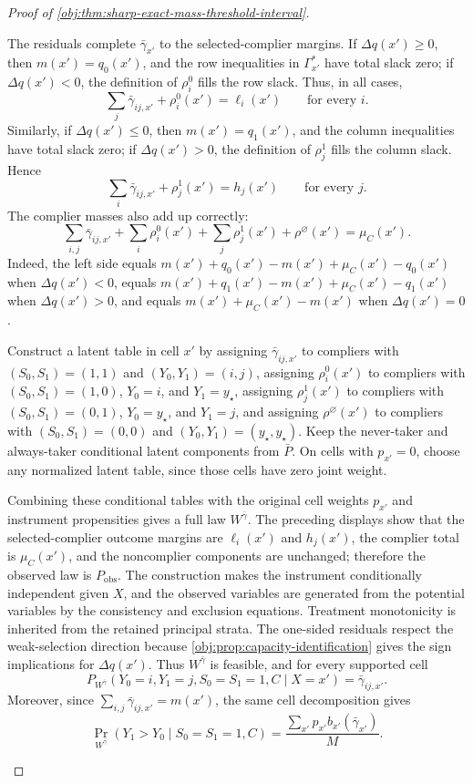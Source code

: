 \documentclass[11pt]{article}
\begin{document}
\begin{proof}[Proof of \cref{obj:thm:sharp-exact-mass-threshold-interval}]
\begin{enumerate}
The residuals complete \(\bar\gamma_{x'}\) to the selected-complier margins.  If \(\Delta q(x')\ge0\), then \(m(x')=q_0(x')\), and the row inequalities in \(\Gamma_{x'}^\ast\) have total slack zero; if \(\Delta q(x')<0\), the definition of \(\rho_i^0\) fills the row slack.  Thus, in all cases,
\[
\sum_j\bar\gamma_{ij,x'}+\rho_i^0(x')=\ell_i(x')\qquad\text{for every }i.
\]
Similarly, if \(\Delta q(x')\le0\), then \(m(x')=q_1(x')\), and the column inequalities have total slack zero; if \(\Delta q(x')>0\), the definition of \(\rho_j^1\) fills the column slack.  Hence
\[
\sum_i\bar\gamma_{ij,x'}+\rho_j^1(x')=h_j(x')\qquad\text{for every }j.
\]
The complier masses also add up correctly:
\[
\sum_{i,j}\bar\gamma_{ij,x'}+
\sum_i\rho_i^0(x')+
\sum_j\rho_j^1(x')+\rho^\varnothing(x')
=\mu_C(x').
\]
Indeed, the left side equals \(m(x')+q_0(x')-m(x')+\mu_C(x')-q_0(x')\) when \(\Delta q(x')<0\), equals \(m(x')+q_1(x')-m(x')+\mu_C(x')-q_1(x')\) when \(\Delta q(x')>0\), and equals \(m(x')+\mu_C(x')-m(x')\) when \(\Delta q(x')=0\).

Construct a latent table in cell \(x'\) by assigning \(\bar\gamma_{ij,x'}\) to compliers with \((S_0,S_1)=(1,1)\) and \((Y_0,Y_1)=(i,j)\), assigning \(\rho_i^0(x')\) to compliers with \((S_0,S_1)=(1,0)\), \(Y_0=i\), and \(Y_1=y_\star\), assigning \(\rho_j^1(x')\) to compliers with \((S_0,S_1)=(0,1)\), \(Y_0=y_\star\), and \(Y_1=j\), and assigning \(\rho^\varnothing(x')\) to compliers with \((S_0,S_1)=(0,0)\) and \((Y_0,Y_1)=(y_\star,y_\star)\).  Keep the never-taker and always-taker conditional latent components from \(\bar P\).  On cells with \(p_{x'}=0\), choose any normalized latent table, since those cells have zero joint weight.

Combining these conditional tables with the original cell weights \(p_{x'}\) and instrument propensities gives a full law \(W^{\bar\gamma}\).  The preceding displays show that the selected-complier outcome margins are \(\ell_i(x')\) and \(h_j(x')\), the complier total is \(\mu_C(x')\), and the noncomplier components are unchanged; therefore the observed law is \(P_{\mathrm{obs}}\).  The construction makes the instrument conditionally independent given \(X\), and the observed variables are generated from the potential variables by the consistency and exclusion equations.  Treatment monotonicity is inherited from the retained principal strata.  The one-sided residuals respect the weak-selection direction because \cref{obj:prop:capacity-identification} gives the sign implications for \(\Delta q(x')\).  Thus \(W^{\bar\gamma}\) is feasible, and for every supported cell
\[
P_{W^{\bar\gamma}}(Y_0=i,Y_1=j,S_0=S_1=1,C\mid X=x')=\bar\gamma_{ij,x'}.
\]
Moreover, since \(\sum_{i,j}\bar\gamma_{ij,x'}=m(x')\), the same cell decomposition gives
\[
\Pr_{W^{\bar\gamma}}(Y_1>Y_0\mid S_0=S_1=1,C)
=
\frac{\sum_{x'}p_{x'}b_{x'}(\bar\gamma_{x'})}{M}.
\]



\end{enumerate}
\end{proof}
\end{document}
